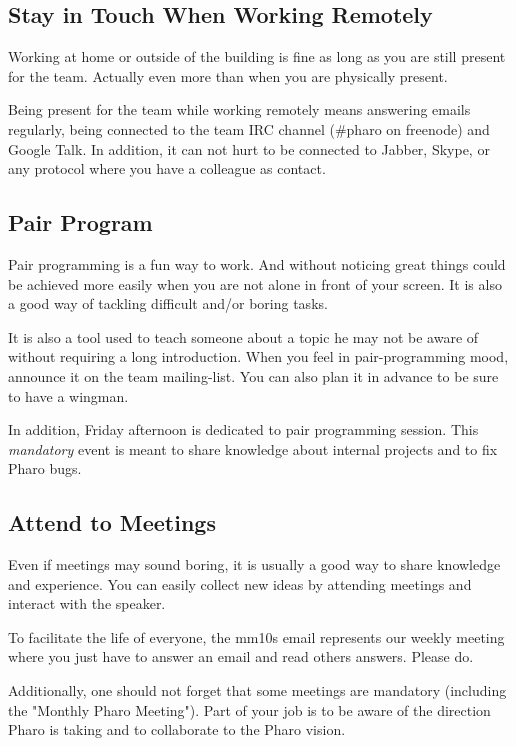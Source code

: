 \documentclass[10pt]{article}
\begin{document}
\subsection{Stay in Touch When Working Remotely}

Working at home or outside of the building is fine as long as you are still present for the team. Actually even more than when you are physically present.

Being present for the team while working remotely means answering emails regularly, being connected to the team IRC channel (\#pharo on freenode) and Google Talk. In addition, it can not hurt to be connected to Jabber, Skype, or any protocol where you have a colleague as contact.

\subsection{Pair Program}

Pair programming is a fun way to work. And without noticing great things could be achieved more easily when you are not alone in front of your screen. It is also a good way of tackling difficult and/or boring tasks.

It is also a tool used to teach someone about a topic he may not be aware of without requiring a long introduction. When you feel in pair-programming mood, announce it on the team mailing-list. You can also plan it in advance to be sure to have a wingman.

In addition, Friday afternoon is dedicated to pair programming session. This \emph{mandatory} event is meant to share knowledge about internal projects and to fix Pharo bugs. %

\subsection{Attend to Meetings}

Even if meetings may sound boring, it is usually a good way to share knowledge and experience.
You can easily collect new ideas by attending meetings and interact with the speaker.

To facilitate the life of everyone, the mm10s email represents our
weekly meeting where you just have to answer an email and read others
answers. Please do.

Additionally, one should not forget that some meetings are mandatory (including the "Monthly Pharo Meeting").
Part of your job is to be aware of the direction Pharo is taking and to collaborate to the Pharo vision.
\end{document}
